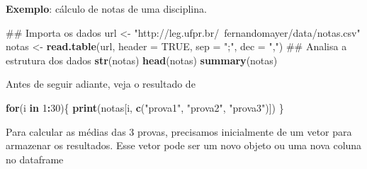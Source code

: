 \documentclass[10pt,a4paper]{book}
\newenvironment{Shaded}{\begin{snugshade}}{\end{snugshade}}
\newcommand{\KeywordTok}[1]{\textcolor[rgb]{0.13,0.29,0.53}{\textbf{#1}}}
\newcommand{\DataTypeTok}[1]{\textcolor[rgb]{0.13,0.29,0.53}{#1}}
\newcommand{\DecValTok}[1]{\textcolor[rgb]{0.00,0.00,0.81}{#1}}
\newcommand{\StringTok}[1]{\textcolor[rgb]{0.31,0.60,0.02}{#1}}
\newcommand{\OtherTok}[1]{\textcolor[rgb]{0.56,0.35,0.01}{#1}}
\newcommand{\ControlFlowTok}[1]{\textcolor[rgb]{0.13,0.29,0.53}{\textbf{#1}}}
\newcommand{\OperatorTok}[1]{\textcolor[rgb]{0.81,0.36,0.00}{\textbf{#1}}}
\newcommand{\NormalTok}[1]{#1}
\begin{document}
\textbf{Exemplo}: cálculo de notas de uma disciplina.

\begin{Shaded}
\begin{Highlighting}[]
\NormalTok{## Importa os dados}
\NormalTok{url <-}\StringTok{ "http://leg.ufpr.br/~fernandomayer/data/notas.csv"}
\NormalTok{notas <-}\StringTok{ }\KeywordTok{read.table}\NormalTok{(url, }\DataTypeTok{header =} \OtherTok{TRUE}\NormalTok{, }\DataTypeTok{sep =} \StringTok{";"}\NormalTok{, }\DataTypeTok{dec =} \StringTok{","}\NormalTok{)}
\NormalTok{## Analisa a estrutura dos dados}
\KeywordTok{str}\NormalTok{(notas)}
\KeywordTok{head}\NormalTok{(notas)}
\KeywordTok{summary}\NormalTok{(notas)}
\end{Highlighting}
\end{Shaded}

Antes de seguir adiante, veja o resultado de

\begin{Shaded}
\begin{Highlighting}[]
\ControlFlowTok{for}\NormalTok{(i }\ControlFlowTok{in} \DecValTok{1}\OperatorTok{:}\DecValTok{30}\NormalTok{)\{}
    \KeywordTok{print}\NormalTok{(notas[i, }\KeywordTok{c}\NormalTok{(}\StringTok{"prova1"}\NormalTok{, }\StringTok{"prova2"}\NormalTok{, }\StringTok{"prova3"}\NormalTok{)])}
\NormalTok{\}}
\end{Highlighting}
\end{Shaded}

Para calcular as médias das 3 provas, precisamos inicialmente de um
vetor para armazenar os resultados. Esse vetor pode ser um novo objeto
ou uma nova coluna no dataframe
\end{document}
